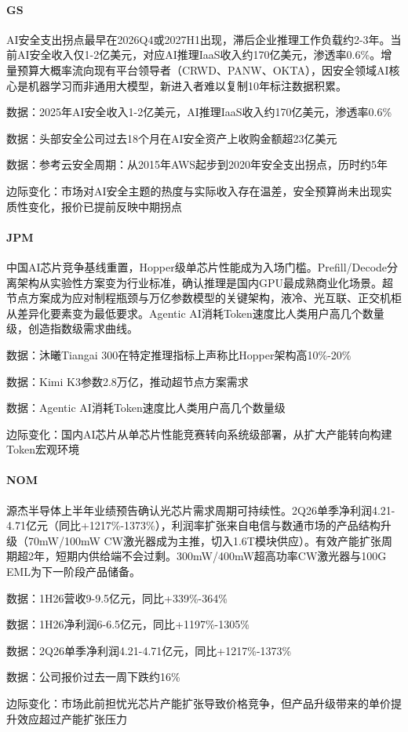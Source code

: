 \documentclass[11pt]{ctexart}
\begin{document}
\paragraph{GS} AI安全支出拐点最早在2026Q4或2027H1出现，滞后企业推理工作负载约2-3年。当前AI安全收入仅1-2亿美元，对应AI推理IaaS收入约170亿美元，渗透率0.6\%。增量预算大概率流向现有平台领导者（CRWD、PANW、OKTA），因安全领域AI核心是机器学习而非通用大模型，新进入者难以复制10年标注数据积累。
{\small\color{refgray}数据：2025年AI安全收入1-2亿美元，AI推理IaaS收入约170亿美元，渗透率0.6\%\par}
{\small\color{refgray}数据：头部安全公司过去18个月在AI安全资产上收购金额超23亿美元\par}
{\small\color{refgray}数据：参考云安全周期：从2015年AWS起步到2020年安全支出拐点，历时约5年\par}
{\small\color{refgray}边际变化：市场对AI安全主题的热度与实际收入存在温差，安全预算尚未出现实质性变化，报价已提前反映中期拐点\par}
\paragraph{JPM} 中国AI芯片竞争基线重置，Hopper级单芯片性能成为入场门槛。Prefill/Decode分离架构从实验性方案变为行业标准，确认推理是国内GPU最成熟商业化场景。超节点方案成为应对制程瓶颈与万亿参数模型的关键架构，液冷、光互联、正交机柜从差异化要素变为最低要求。Agentic AI消耗Token速度比人类用户高几个数量级，创造指数级需求曲线。
{\small\color{refgray}数据：沐曦Tiangai 300在特定推理指标上声称比Hopper架构高10\%-20\%\par}
{\small\color{refgray}数据：Kimi K3参数2.8万亿，推动超节点方案需求\par}
{\small\color{refgray}数据：Agentic AI消耗Token速度比人类用户高几个数量级\par}
{\small\color{refgray}边际变化：国内AI芯片从单芯片性能竞赛转向系统级部署，从扩大产能转向构建Token宏观环境\par}
\paragraph{NOM} 源杰半导体上半年业绩预告确认光芯片需求周期可持续性。2Q26单季净利润4.21-4.71亿元（同比+1217\%-1373\%），利润率扩张来自电信与数通市场的产品结构升级（70mW/100mW CW激光器成为主推，切入1.6T模块供应）。有效产能扩张周期超2年，短期内供给端不会过剩。300mW/400mW超高功率CW激光器与100G EML为下一阶段产品储备。
{\small\color{refgray}数据：1H26营收9-9.5亿元，同比+339\%-364\%\par}
{\small\color{refgray}数据：1H26净利润6-6.5亿元，同比+1197\%-1305\%\par}
{\small\color{refgray}数据：2Q26单季净利润4.21-4.71亿元，同比+1217\%-1373\%\par}
{\small\color{refgray}数据：公司报价过去一周下跌约16\%\par}
{\small\color{refgray}边际变化：市场此前担忧光芯片产能扩张导致价格竞争，但产品升级带来的单价提升效应超过产能扩张压力\par}
\end{document}
